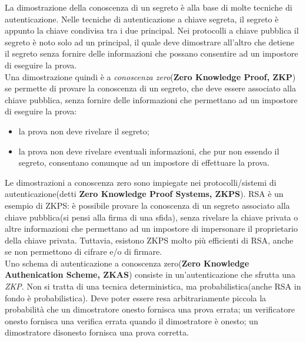 La dimostrazione della conoscenza di un segreto è alla base di molte tecniche di autenticazione. Nelle tecniche di autenticazione a chiave segreta, il segreto è appunto la chiave condivisa tra i due principal. Nei protocolli a chiave pubblica il segreto è noto solo ad un principal, il quale deve dimostrare all'altro che detiene il segreto senza fornire delle informazioni che possano consentire ad un impostore di eseguire la prova. \\
Una dimostrazione quindi è a \textit{conoscenza zero}(\textbf{Zero Knowledge Proof, ZKP}) se permette di provare la conoscenza di un segreto, che deve essere associato alla chiave pubblica, senza fornire delle informazioni che permettano ad un impostore di eseguire la prova: \begin{itemize}
\item la prova non deve rivelare il segreto;
\item la prova non deve rivelare eventuali informazioni, che pur non essendo il segreto, consentano comunque ad un impostore di effettuare la prova.
\end{itemize}
Le dimostrazioni a conoscenza zero sono impiegate nei protocolli/sistemi di autenticazione(detti \textbf{Zero Knowledge Proof Systems, ZKPS}). RSA è un esempio di ZKPS: è possibile provare la conoscenza di un segreto associato alla chiave pubblica(si pensi alla firma di una sfida), senza rivelare la chiave privata o altre informazioni che
permettano ad un impostore di impersonare il proprietario
della chiave privata. Tuttavia, esistono ZKPS molto più efficienti di RSA, anche se non permettono di cifrare e/o di firmare. \\

Uno schema di autenticazione a conoscenza zero(\textbf{Zero Knowledge Authenication Scheme, ZKAS}) consiste in un'autenticazione che sfrutta una \textit{ZKP}. Non si tratta di una tecnica deterministica, ma
probabilistica(anche RSA in fondo è probabilistica). Deve poter essere resa arbitrariamente piccola la probabilità che un dimostratore onesto fornisca una prova errata; un verificatore onesto fornisca una verifica errata quando il dimostratore è onesto; un dimostratore disonesto fornisca una prova corretta. 

